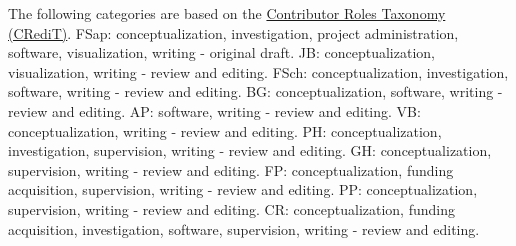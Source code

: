 \noindent
The following categories are based on the \href{https://credit.niso.org/}{Contributor Roles Taxonomy (CRediT)}. 
FSap: conceptualization, investigation, project administration, software, visualization, writing - original draft.
JB: conceptualization, visualization, writing - review and editing.
FSch: conceptualization, investigation, software, writing - review and editing.
BG: conceptualization, software, writing - review and editing.
AP: software, writing - review and editing.
VB: conceptualization, writing - review and editing.
PH: conceptualization, investigation, supervision, writing - review and editing.
GH: conceptualization, supervision, writing - review and editing.
FP: conceptualization, funding acquisition, supervision, writing - review and editing.
PP: conceptualization, supervision, writing - review and editing.
CR: conceptualization, funding acquisition, investigation, software, supervision, writing - review and editing.